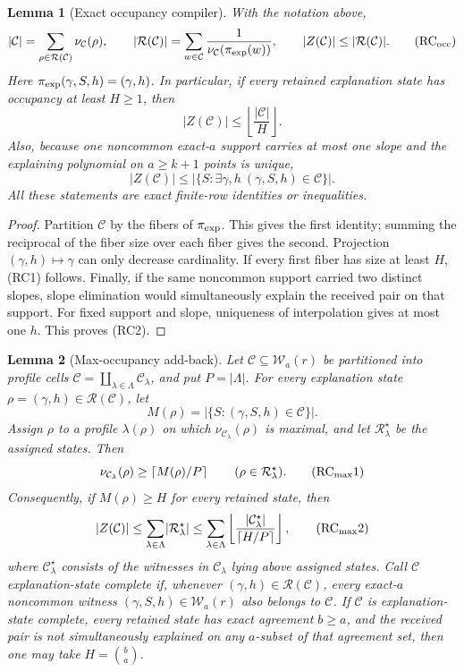 \documentclass[12pt,a4paper]{amsart}
\numberwithin{equation}{section}
\newtheorem{lemma}[lemma]{Lemma}
\theoremstyle{remark}
\newcommand{\Ccal}{\mathcal C}
\newcommand{\Rcal}{\mathcal R}
\newcommand{\Wcal}{\mathcal W}
\newcommand{\abs}[1]{\lvert #1\rvert}
\newcommand{\floor}[1]{\left\lfloor #1\right\rfloor}
\newcommand{\ceil}[1]{\left\lceil #1\right\rceil}
\begin{document}
\begin{lemma}[Exact occupancy compiler]
\label{lem:exact-occupancy-compiler}
With the notation above,
\[
 \abs{\Ccal}=\sum_{\rho\in\Rcal(\Ccal)}\nu_{\Ccal}(\rho),
 \qquad
 \abs{\Rcal(\Ccal)}
   =\sum_{w\in\Ccal}
       \frac1{\nu_{\Ccal}(\pi_{\rm exp}(w))},
 \qquad
 \abs{Z(\Ccal)}\le\abs{\Rcal(\Ccal)}.             \tag{RC$_{\rm occ}$}
\]
Here \(\pi_{\rm exp}(\gamma,S,h)=(\gamma,h)\).  In particular, if every
retained explanation state has occupancy at least \(H\ge1\), then
\[
        \abs{Z(\Ccal)}\le
        \floor{\frac{\abs{\Ccal}}H}.                \tag{RC1}
\]
Also, because one noncommon exact-\(a\) support carries at most one slope
and the explaining polynomial on \(a\ge k+1\) points is unique,
\[
 \abs{Z(\Ccal)}\le
 \abs{\{S:\exists\gamma,h\ (\gamma,S,h)\in\Ccal\}}. \tag{RC2}
\]
All these statements are exact finite-row identities or inequalities.
\end{lemma}

\begin{proof}
Partition \(\Ccal\) by the fibers of \(\pi_{\rm exp}\).  This gives the
first identity; summing the reciprocal of the fiber size over each fiber
gives the second.  Projection \((\gamma,h)\mapsto\gamma\) can only
decrease cardinality.  If every first fiber has size at least \(H\),
\textup{(RC1)} follows.  Finally, if the same noncommon support carried two
distinct slopes, slope elimination would simultaneously explain the
received pair on that support.  For fixed support and slope, uniqueness of
interpolation gives at most one \(h\).  This proves \textup{(RC2)}.
\end{proof}

\begin{lemma}[Max-occupancy add-back]
\label{lem:max-occupancy-addback}
Let \(\Ccal\subseteq\Wcal_a(r)\) be partitioned into profile cells
\(\Ccal=\coprod_{\lambda\in\Lambda}\Ccal_\lambda\), and put
\(P=\abs\Lambda\).  For every explanation state
\(\rho=(\gamma,h)\in\Rcal(\Ccal)\), let
\[
 M(\rho)=\abs{\{S:(\gamma,S,h)\in\Ccal\}}.
\]
Assign \(\rho\) to a profile \(\lambda(\rho)\) on which
\(\nu_{\Ccal_\lambda}(\rho)\) is maximal, and let
\(\Rcal_\lambda^\star\) be the assigned states.  Then
\[
 \nu_{\Ccal_\lambda}(\rho)\ge\ceil{M(\rho)/P}
 \qquad(\rho\in\Rcal_\lambda^\star).               \tag{RC$_{\rm max}$1}
\]
Consequently, if \(M(\rho)\ge H\) for every retained state, then
\[
 \abs{Z(\Ccal)}
 \le\sum_{\lambda\in\Lambda}\abs{\Rcal_\lambda^\star}
 \le\sum_{\lambda\in\Lambda}
   \floor{\frac{\abs{\Ccal_\lambda^\star}}
                   {\ceil{H/P}}},                  \tag{RC$_{\rm max}$2}
\]
where \(\Ccal_\lambda^\star\) consists of the witnesses in
\(\Ccal_\lambda\) lying above assigned states.  Call \(\Ccal\)
\emph{explanation-state complete} if, whenever
\((\gamma,h)\in\Rcal(\Ccal)\), every exact-\(a\) noncommon witness
\((\gamma,S,h)\in\Wcal_a(r)\) also belongs to \(\Ccal\).  If \(\Ccal\)
is explanation-state complete, every retained state has exact agreement
\(b\ge a\), and the received pair is not simultaneously explained on any
\(a\)-subset of that agreement set, then one may take \(H=\binom ba\).
\end{lemma}
\end{document}
